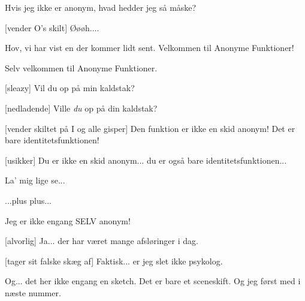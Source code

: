 \documentclass[a4paper,11pt]{article}
\begin{document}
\begin{sketch}

 Hvis jeg ikke er anonym, hvad hedder jeg så måske?

[vender O's skilt] Øøøh....


 Hov, vi har vist en der kommer lidt sent.  Velkommen til
Anonyme Funktioner!

 Selv velkommen til Anonyme Funktioner.

[sleazy] Vil du op på min kaldstak?

[nedladende] Ville \textit{du} op på din kaldstak?

[vender skiltet på I og alle gisper] Den funktion er ikke en
skid anonym!  Det er bare identitetsfunktionen!

[usikker] Du er ikke en skid anonym... du er også bare identitetsfunktionen...

 La' mig lige se...

 ...plus plus...


 Jeg er ikke engang SELV anonym!


[alvorlig] Ja... der har været mange afsløringer i dag.


[tager sit falske skæg af] Faktisk... er jeg slet ikke psykolog.

 Og... det her ikke engang en sketch.  Det er bare et
sceneskift.  Og jeg først med i næste nummer.


\end{sketch}
\end{document}
